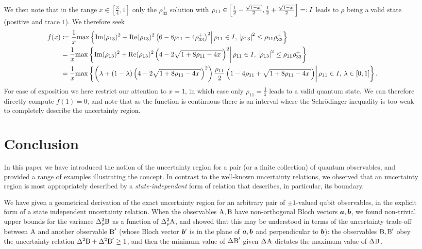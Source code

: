 We then note that in the range $x\in\left[\frac{3}{4} ,1\right]$ only the $\rho_{33}^+$ solution with $\rho_{11} \in \left[\frac{1}{2} - \frac{\sqrt{1-x}}{2},\frac{1}{2} + \frac{\sqrt{1-x}}{2}\right]=:\ival$ leads to $\rho$ being a valid state (positive and trace $1$). We therefore seek
\begin{align}
  f(x) &\coloneqq \frac{1}{x}\max\left\{\Im(\rho_{13})^2 +\Re(\rho_{13})^2\left(6-8\rho_{11}-4\rho_{33}^+\right)^2\middle|\, \rho_{11}\in \ival,\,\left\lvert\rho_{13}\right\rvert^2 \leq \rho_{11}\rho_{33}^+\right\}\\
       &= \frac{1}{x}\max\left\{\Im(\rho_{13})^2 +\Re(\rho_{13})^2\left(4-2\sqrt{1+8\rho_{11}-4x}\right)^2\middle|\, \rho_{11}\in\ival,\,\left\lvert\rho_{13}\right\rvert^2 \leq \rho_{11}\rho_{33}^+\right\}\\
       &= \frac{1}{x}\max\left\{\left(\lambda +(1-\lambda)\left(4-2\sqrt{1+8\rho_{11}-4x}\right)^2\right)\frac{\rho_{11}}{2}\left(1-4\rho_{11}+\sqrt{1+8\rho_{11}-4x}\right)\middle|\, \rho_{11}\in\ival,\,\lambda\in[0,1]\right\}.
\end{align}
For ease of exposition we here restrict our attention to $x = 1$, in which case only $\rho_{11} = \frac{1}{2}$ leads to a valid quantum state. We can therefore directly compute $f(1) = 0$, and note that as the function is continuous there is an interval where the Schr\"odinger inequality is too weak to completely describe the uncertainty region.  

\section{Conclusion} \label{sec:conclusion}
In this paper we have introduced the notion of the uncertainty region for a pair (or a finite collection) of quantum observables, and provided a range of examples illustrating the concept. In contrast to the well-known uncertainty relations, we observed that an uncertainty region is most appropriately described by a {\em state-independent} form of relation that describes, in particular, its boundary.

We have given a geometrical derivation of the exact uncertainty region for an  arbitrary pair of $\pm1$-valued qubit observables, in the explicit form of a state independent uncertainty relation.  When the observables $\operatorname{A},\operatorname{B}$ have non-orthogonal Bloch vectors $\bm{a},\bm{b}$, we found non-trivial upper bounds for the variance $\varr{\opb}$ as a function of $\varr{\opa}$, and showed that this may be understood in terms of the uncertainty trade-off between $\operatorname{A}$ and another observable $\operatorname{B}'$ (whose Bloch vector $\bm{b}'$ is in the plane of $\bm{a},\bm{b}$ and perpendicular to $\bm{b}$): the observables $\operatorname{B},\operatorname{B}'$ obey the uncertainty relation $\var{\opb}+\var{\opb'}\ge 1$, and then the minimum value of $\sdev{\opb'}$ given $\sdev{\opa}$ dictates the maximum value of $\sdev{\opb}$.

